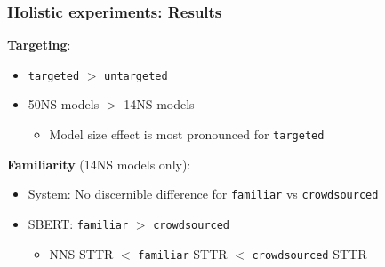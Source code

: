 \documentclass[xcolor={dvipsnames}]{beamer}
\newcommand{\param}[1]{\texttt{#1}}
\begin{document}
\begin{frame}
\frametitle{Holistic experiments: Results}

\vspace{-.5em}

\pause
\textbf{Targeting}:
\begin{itemize}
\pause
\item \param{targeted} $>$ \param{untargeted}
\pause
\item 50NS models $>$ 14NS models
\begin{itemize}
\pause
\item Model size effect is most pronounced for \param{targeted}
\end{itemize}
\end{itemize}

\vspace{1em}

\pause
\textbf{Familiarity} (14NS models only):
\begin{itemize}
\pause
\item System: No discernible difference for \param{familiar} vs \param{crowdsourced}
\pause
\item SBERT: \param{familiar} $>$ \param{crowdsourced}
\begin{itemize}
\pause
\item NNS STTR $<$ \param{familiar} STTR $<$ \param{crowdsourced} STTR
\end{itemize}
\end{itemize}

\end{frame}
\end{document}
